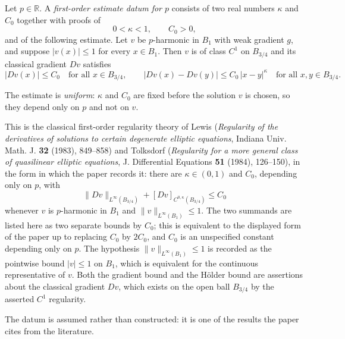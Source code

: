 \begin{definition}
Let $p\in\mathbb{R}$.  A \emph{first-order estimate datum for $p$} consists of two real
numbers $\kappa$ and $C_0$ together with proofs of
\[
  0<\kappa<1,\qquad C_0>0,
\]
and of the following estimate.  Let $v$ be $p$-harmonic in $B_1$ with weak gradient $g$, and
suppose $\lvert v(x)\rvert\le1$ for every $x\in B_1$.  Then $v$ is of class $C^1$ on
$B_{3/4}$ and its classical gradient $Dv$ satisfies
\[
  \lvert Dv(x)\rvert\le C_0\quad\text{for all }x\in B_{3/4},
  \qquad
  \lvert Dv(x)-Dv(y)\rvert\le C_0\,\lvert x-y\rvert^{\kappa}
  \quad\text{for all }x,y\in B_{3/4}.
\]

The estimate is \emph{uniform}: $\kappa$ and $C_0$ are fixed before the solution $v$ is
chosen, so they depend only on $p$ and not on $v$.

This is the classical first-order regularity theory of Lewis (\emph{Regularity of the
derivatives of solutions to certain degenerate elliptic equations}, Indiana Univ. Math. J.
\textbf{32} (1983), 849--858) and Tolksdorf (\emph{Regularity for a more general class of
quasilinear elliptic equations}, J. Differential Equations \textbf{51} (1984), 126--150), in
the form in which the paper records it: there are $\kappa\in(0,1)$ and $C_0$, depending only
on $p$, with
\[
  \lVert Dv\rVert_{L^\infty(B_{3/4})}+[Dv]_{C^{0,\kappa}(B_{3/4})}\le C_0
\]
whenever $v$ is $p$-harmonic in $B_1$ and $\lVert v\rVert_{L^\infty(B_1)}\le1$.  The two
summands are listed here as two separate bounds by $C_0$; this is equivalent to the displayed
form of the paper up to replacing $C_0$ by $2C_0$, and $C_0$ is an unspecified constant
depending only on $p$.  The hypothesis $\lVert v\rVert_{L^\infty(B_1)}\le1$ is recorded as the
pointwise bound $\lvert v\rvert\le1$ on $B_1$, which is equivalent for the continuous
representative of $v$.  Both the gradient bound and the H\"older bound are assertions about
the classical gradient $Dv$, which exists on the open ball $B_{3/4}$ by the asserted $C^1$
regularity.

The datum is assumed rather than constructed: it is one of the results the paper cites from
the literature.
\end{definition}
